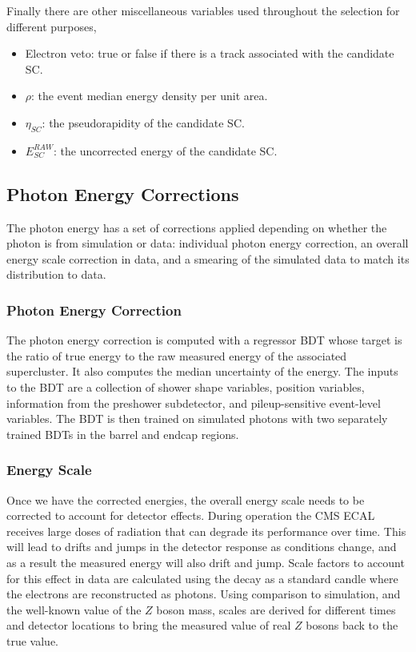 Finally there are other miscellaneous variables used throughout the selection for different purposes,
\begin{itemize}[noitemsep]
    \item Electron veto: true or false if there is a track associated with the candidate SC.
    \item $\rho$: the event median energy density per unit area.
    \item $\eta_{SC}$: the pseudorapidity of the candidate SC.
    \item $E_{SC}^{RAW}$: the uncorrected energy of the candidate SC.
\end{itemize}



\subsection{Photon Energy Corrections}

The photon energy has a set of corrections applied depending on whether the photon is from simulation or data: individual photon energy correction, an overall energy scale correction in data, and a smearing of the simulated data to match its distribution to data. 

\subsubsection{Photon Energy Correction}
The photon energy correction is computed with a regressor BDT whose target is the ratio of true energy to the raw measured energy of the associated supercluster. It also computes the median uncertainty of the energy. 
The inputs to the BDT are a collection of shower shape variables, position variables, information from the preshower subdetector, and pileup-sensitive event-level variables.
The BDT is then trained on simulated photons with two separately trained BDTs in the barrel and endcap regions. 


\subsubsection{Energy Scale}
Once we have the corrected energies, the overall energy scale needs to be corrected to account for detector effects. 
During operation the CMS ECAL receives large doses of radiation that can degrade its performance over time. 
This will lead to drifts and jumps in the detector response as conditions change, and as a result the measured energy will also drift and jump. 
Scale factors to account for this effect in data are calculated using the \Zee decay as a standard candle where the electrons are reconstructed as photons. 
Using comparison to simulation, and the well-known value of the $Z$ boson mass, scales are derived for different times and detector locations to bring the measured value of real $Z$ bosons back to the true value. 


